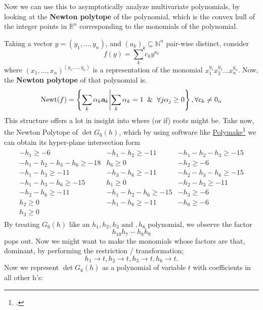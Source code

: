 Now we can use this to asymptotically analyze multivariate polynomials, by looking at the \textbf{Newton polytope} of the polynomial, which is the convex hull of the integer points in $\mathbb{R}^n$ corresponding to the monomials of the polynomial.

Taking a vector $y = (y_1, \ldots, y_n)$, and $(a_k)_k \subseteq \mathbb{N}^n$ pair-wise distinct, consider
\[
 f(y) = \sum_{k} c_k y^{a_k}
\]
where $(x_1, \ldots, x_n)^{(y_1, \ldots, y_n)}$ is a representation of the monomial $x_1^{y_1} x_2^{y_2} \ldots x_n^{y_n}$.
Now, the \textbf{Newton polytope} of that polynomial is.
\[
	\mathrm{Newt}(f)=\left\{\sum_k\alpha_k\mathbf{a}_k \middle|\sum_k\alpha_k=1\And\forall j\alpha_j\geq0\right\}, \forall c_k \neq 0_n
\]
This structure offers a lot in insight into where (or if) roots might be.
Take now, the Newton Polytope of $\det G_6(h)$, which by using software like \href{https://polymake.org/doku.php/start}{Polymake}\footcite{Assarf2017, Gawrilow2000} we can obtain its hyper-plane intersection form
\begin{align*}
	\left.
	\begin{array}{ccc}
		-h_{1} \geq -6 &
		-h_{1} - h_{2} \geq -11 &
		-h_{1} - h_{2} - h_{3} \geq -15 \\
		-h_{1} - h_{2} - h_{3} - h_{6} \geq -18 &
		h_{6} \geq 0 &
		-h_{2} \geq -6 \\
		-h_{1} - h_{3} \geq -11 &
		-h_{3} - h_{6} \geq -11 &
		-h_{2} - h_{3} - h_{6} \geq -15 \\
		-h_{1} - h_{3} - h_{6} \geq -15 &
		h_{1} \geq 0 &
		-h_{2} - h_{3} \geq -11 \\
		-h_{2} - h_{6} \geq -11 &
		-h_{1} - h_{2} - h_{6} \geq -15 &
		-h_{3} \geq -6 \\
		h_{2} \geq 0 &
		-h_{1} - h_{6} \geq -11 &
		-h_{6} \geq -6 \\
		h_{3} \geq 0
	\end{array} \right.
\end{align*}
By treating $G_6(h)$ like an $h_1, h_2, h_3 \text{ and }, h_6$ polynomial, we observe the factor
\[
	h_{10}h_7 - h_8 h_9
\]
pops out. Now we might want to make the monomials whose factors are that, dominant, by performing the restriction / transformation;
\begin{equation}\label{h_substitution}
	h_1\to t,h_2\to t,h_3\to t,h_6\to t.
\end{equation}
Now we represent $\det G_6(h)$ as a polynomial of variable $t$ with coefficients in all other h's:
